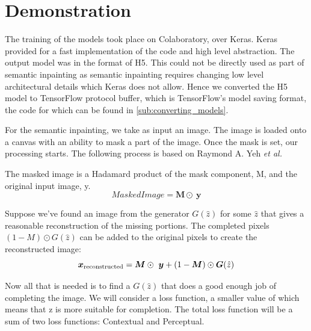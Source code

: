 
\section{Demonstration} %
\label{sec:imp_demonstration}
The training of the models took place on Colaboratory, over Keras. Keras provided for a fast implementation of the code and high level abstraction. The output model was in the format of H5. This could not be directly used as part of semantic inpainting as semantic inpainting requires changing low level architectural details which Keras does not allow. Hence we converted the H5 model to TensorFlow protocol buffer, which is TensorFlow's model saving format, the code for which can be found in \ref{sub:converting_models}.
\par\bigskip

For the semantic inpainting, we take as input an image. The image is loaded onto a canvas with an ability to mask a part of the image. Once the mask is set, our processing starts. The following process is based on Raymond A. Yeh \textit{et al.} \cite{inpainting}
\par\bigskip

The masked image is a Hadamard product of the mask component, M, and the original input image, y. 
\begin{equation} \label{eqn:masked_image}
Masked Image = \bm{M} \odot\  \bm{y}
\end{equation}
\par\bigskip

Suppose we've found an image from the generator $G(\hat z)$ for some $\hat z$ that gives a reasonable reconstruction of the missing portions. The completed pixels $(1 - M) \odot G(\hat z)$ can be added to the original pixels to create the reconstructed image:
\begin{equation} \label{eqn:reconstructed_image}
\bm{x} \textsubscript{reconstructed} = \bm{M} \odot\  \bm{y} + (1 - \bm{M}) \odot \bm{G} (\hat z)
\end{equation}
\par\bigskip

Now all that is needed is to find a $G(\hat z)$ that does a good enough job of completing the image. We will consider a loss function, a smaller value of which means that z is more suitable for completion. The total loss function will be a sum of two loss functions: Contextual and Perceptual.

